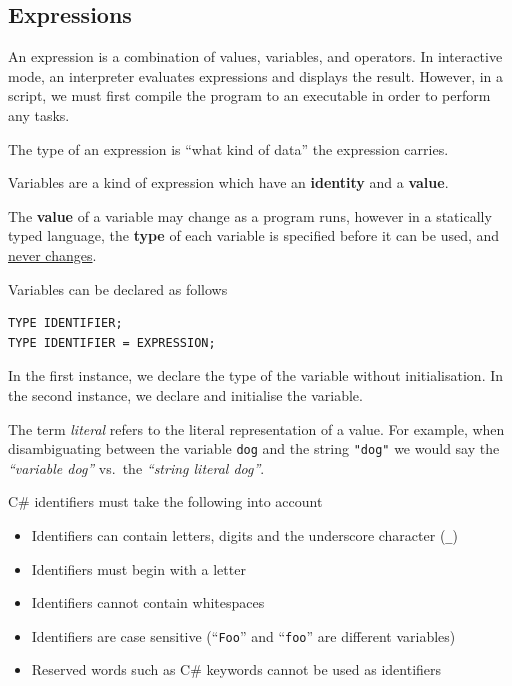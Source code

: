 \documentclass{article}
\begin{document}
\subsection{Expressions}
\begin{definition}[Expressions]
    An expression is a combination of values, variables, and operators.
    In interactive mode, an interpreter evaluates expressions and displays the result.
    However, in a script, we must first compile the program to an executable in order
    to perform any tasks.
\end{definition}
\begin{definition}[Type]
    The type of an expression is ``what kind of data'' the expression carries.
\end{definition}
\begin{definition}[Variables]
    Variables are a kind of expression which have an \textbf{identity} and a \textbf{value}.

    The \textbf{value} of a variable may change as a program runs,
    however in a statically typed language, the \textbf{type} of each
    variable is specified before it can be used, and \underline{never
    changes}.

    Variables can be declared as follows
    \begin{verbatim}
TYPE IDENTIFIER;
TYPE IDENTIFIER = EXPRESSION;
\end{verbatim}
    In the first instance, we declare the type of the variable without
    initialisation. In the second instance, we declare and initialise
    the variable.
\end{definition}
\begin{definition}[Literal]
    The term \textit{literal} refers to the literal representation of a value.
    For example, when disambiguating between the variable \texttt{dog}
    and the string \texttt{"dog"} we would say the \emph{``variable dog''} %
    vs.\ the \emph{``string literal dog''}.
\end{definition}
C\# identifiers must take the following into account
\begin{itemize}
    \item Identifiers can contain letters, digits and the underscore
          character (\texttt{_})
    \item Identifiers must begin with a letter
    \item Identifiers cannot contain whitespaces
    \item Identifiers are case sensitive (``\texttt{Foo}''
          and ``\texttt{foo}'' are different variables) %
    \item Reserved words such as C\# keywords cannot be used as
          identifiers
\end{itemize}
\end{document}
